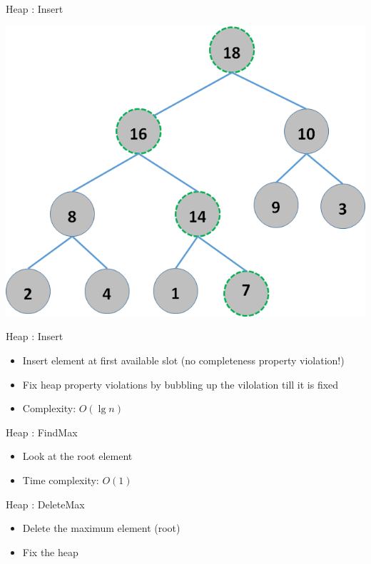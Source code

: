 \documentclass{beamer}
\begin{document}
\begin{frame}{Heap : Insert}
    \begin{center}
        \includegraphics[scale=0.5]{heapInsert5.png}
    \end{center}
\end{frame}

\begin{frame}{Heap : Insert}
    \begin{itemize}
        \item Insert element at first available slot (no completeness property violation!)
        \item Fix heap property violations by bubbling up the vilolation till it is fixed
        \item Complexity: \pause $O(\lg n)$
    \end{itemize}
\end{frame}

\begin{frame}{Heap : FindMax}
    \begin{itemize}
        \item Look at the root element
        \item Time complexity: $O(1)$
    \end{itemize}
\end{frame}

\begin{frame}{Heap : DeleteMax}
    \begin{itemize}
        \item Delete the maximum element (root)
        \item Fix the heap
    \end{itemize}
\end{frame}
\end{document}

